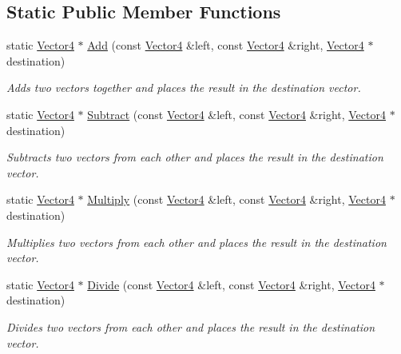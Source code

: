 \subsection*{Static Public Member Functions}
\begin{DoxyCompactItemize}
\item 
static \hyperlink{class_flounder_1_1_vector4}{Vector4} $\ast$ \hyperlink{class_flounder_1_1_vector4_a8fb6b43e4e7b1fc83d803d927d3a1d2a}{Add} (const \hyperlink{class_flounder_1_1_vector4}{Vector4} \&left, const \hyperlink{class_flounder_1_1_vector4}{Vector4} \&right, \hyperlink{class_flounder_1_1_vector4}{Vector4} $\ast$destination)
\begin{DoxyCompactList}\small\item\em Adds two vectors together and places the result in the destination vector. \end{DoxyCompactList}\item 
static \hyperlink{class_flounder_1_1_vector4}{Vector4} $\ast$ \hyperlink{class_flounder_1_1_vector4_a4813a0817cc526aa51c2a84e8269647b}{Subtract} (const \hyperlink{class_flounder_1_1_vector4}{Vector4} \&left, const \hyperlink{class_flounder_1_1_vector4}{Vector4} \&right, \hyperlink{class_flounder_1_1_vector4}{Vector4} $\ast$destination)
\begin{DoxyCompactList}\small\item\em Subtracts two vectors from each other and places the result in the destination vector. \end{DoxyCompactList}\item 
static \hyperlink{class_flounder_1_1_vector4}{Vector4} $\ast$ \hyperlink{class_flounder_1_1_vector4_ac9e61f799baecf33567b316cb352402e}{Multiply} (const \hyperlink{class_flounder_1_1_vector4}{Vector4} \&left, const \hyperlink{class_flounder_1_1_vector4}{Vector4} \&right, \hyperlink{class_flounder_1_1_vector4}{Vector4} $\ast$destination)
\begin{DoxyCompactList}\small\item\em Multiplies two vectors from each other and places the result in the destination vector. \end{DoxyCompactList}\item 
static \hyperlink{class_flounder_1_1_vector4}{Vector4} $\ast$ \hyperlink{class_flounder_1_1_vector4_a3de5f0c12e7daa8e0b81156ef5c67f27}{Divide} (const \hyperlink{class_flounder_1_1_vector4}{Vector4} \&left, const \hyperlink{class_flounder_1_1_vector4}{Vector4} \&right, \hyperlink{class_flounder_1_1_vector4}{Vector4} $\ast$destination)
\begin{DoxyCompactList}\small\item\em Divides two vectors from each other and places the result in the destination vector. \end{DoxyCompactList}\item 

\end{DoxyCompactItemize}
